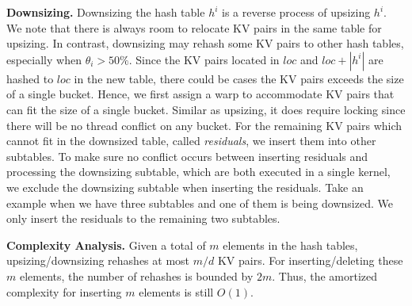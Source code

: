\vspace{1mm}\noindent\textbf{Downsizing.}
Downsizing the hash table $h^i$ is a reverse process of upsizing $h^i$. We note that there is always room to relocate KV pairs in the same table for upsizing. 
In contrast, downsizing may rehash some KV pairs to other hash tables, especially when $\theta_i > 50\%$.
Since the KV pairs located in $loc$ and $loc+|h^i|$ are hashed to $loc$ in the new table, there could be cases the KV pairs exceeds the size of a single bucket. 
Hence, we first assign a warp to accommodate KV pairs that can fit the size of a single bucket. Similar as upsizing, it does require locking since there will be no thread conflict on any bucket. 
For the remaining KV pairs which cannot fit in the downsized table, called \emph{residuals}, we insert them into other subtables.
To make sure no conflict occurs between inserting residuals and processing the downsizing subtable, which are both executed in a single kernel, we exclude the downsizing subtable when inserting the residuals. 
Take an example when we have three subtables and one of them is being downsized. 
We only insert the residuals to the remaining two subtables. 



\vspace{1mm}\noindent\textbf{Complexity Analysis.}
Given a total of $m$ elements in the hash tables, upsizing/downsizing rehashes at most $m/d$ KV pairs. 
For inserting/deleting these $m$ elements, the number of rehashes is bounded by $2m$. 
Thus, the amortized complexity for inserting $m$ elements is still $O(1)$.
